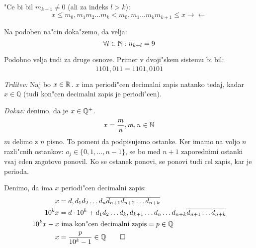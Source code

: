 \begin{itemize}
	"Ce bi bil $m_{k+1} \neq 0$ (ali za indeks $l > k$):
	\begin{equation*}
		x \leq m_0,m_1m_2\ldots m_k < m_0,m_1 \ldots m_km_{k+1} \leq x \rightarrow \leftarrow
	\end{equation*}
	
	Na podoben na"cin doka"zemo, da velja:
	\begin{equation*}
	\forall l \in \mathbb{N}: n_{k+l} = 9
	\end{equation*}
\end{itemize}

Podobno velja tudi za druge osnove. Primer v dvoji"skem sistemu bi bil:
\begin{equation*}
1101,011 = 1101,010\overline{1}
\end{equation*}

\emph{Trditev:} Naj bo $x \in \mathbb{R}$. $x$ ima periodi"cen decimalni zapis natanko tedaj, kadar $x \in \mathbb{Q}$ (tudi kon"cen decimalni zapis je periodi"cen).

\emph{Dokaz:} denimo, da je $x \in \mathbb{Q}^+$.
\begin{equation*}
x = \dfrac{m}{n}, m, n \in \mathbb{N}
\end{equation*}
$m$ delimo z $n$ pisno. To pomeni da podpisujemo ostanke. Ker imamo na voljo $n$ razli"cnih ostankov: $o_j \in \{0, 1, \ldots, n-1\}$, se bo med $n+1$ zaporednimi ostanki vsaj eden zagotovo ponovil. Ko se ostanek ponovi, se ponovi tudi cel zapis, kar je perioda.

Denimo, da ima $x$ periodi"cen decimalni zapis:
\begin{align*}
x &= d,d_1d_2\ldots d_n \overline{d_{n+1} d_{n+2}\ldots d_{n+k}}\\
10^k x &= d \cdot 10^k + d_1d_2\ldots d_k, d_{k+1}\ldots d_n \ldots d_{n+k} \overline{d_{n+1} \ldots d_{n+k}}\\
10^kx-x &\text{ ima kon"cen decimalni zapis} = p \in \mathbb{Q}\\
x &= \dfrac{p}{10^k-1} \in \mathbb{Q} \qed
\end{align*}